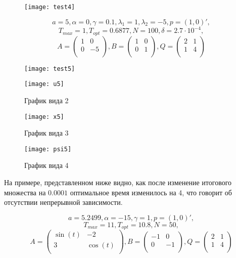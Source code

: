 \documentclass[11pt]{article}
\begin{document}
\begin{figure}[h!]
%
{\texttt{[image: test4]}}
\end{figure}
\newpage

\[a = 5, \alpha = 0, \gamma = 0.1, \lambda_1 = 1, \lambda_2 = -5, p = (1,0)',\] 
\[T_{max} = 1, T_{opt} = 0.6877, N = 100, \delta = 2.7\cdot 10^{-4},\]
\[
A = \left(
\begin{array}{cc}
1 & 0\\
0 & -5\\
\end{array}
\right),
B = \left(
\begin{array}{cc}
1 & 0\\
0 & 1\\
\end{array}
\right),
Q = \left(
\begin{array}{cc}
2 & 1\\
1 & 4\\
\end{array}
\right)
\]

\begin{figure}[h!]
%
{\texttt{[image: test5]}}
\end{figure}

\begin{figure}\caption{График вида 2}
\centering
\texttt{[image: u5]}
\end{figure}

\begin{figure}\caption{График вида 3}
\centering
\texttt{[image: x5]}
\end{figure}

\begin{figure}\caption{График вида 4}
\centering
\texttt{[image: psi5]}
\end{figure}
\newpage

На примере, представленном ниже видно, как после изменение итогового множества на $0.0001$ 
оптимальное время изменилось на 4, что говорит об отсутствии непрерывной зависимости.

\[a = 5.2499, \alpha = -15, \gamma = 1,  p = (1,0)',\] 
\[T_{max} = 11, T_{opt} = 10.8, N = 50,\]
\[
A = \left(
\begin{array}{cc}
\sin(t) & -2\\
3 & \cos(t)\\
\end{array}
\right),
B = \left(
\begin{array}{cc}
-1 & 0\\
0 & -1\\
\end{array}
\right),
Q = \left(
\begin{array}{cc}
2 & 1\\
1 & 4\\
\end{array}
\right)
\]
\end{document}
